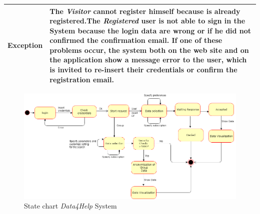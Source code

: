 \begin{table}[H]
\begin{tabular}{|p{3.5cm}|p{10.3cm}|}
    \hline
    \textbf{\large{Exception}} 			& The \emph{Visitor} cannot register himself because is already registered.\newline The \emph{Registered} user                                         is not able to sign in the System because the login data are wrong or if he did not confirmed  the confirmation email. \newline
    										If one of these problems occur, the system both on the web site and on the application show a message error to the user, which is invited to re-insert their credentials or confirm the registration email.\\
    
    \hline
    
    
    \end{tabular}
	
\end{table}

\begin{figure}[H]
    \centering
    \includegraphics[scale=0.4]{Pictures/state chart 1.png}
    \caption{State chart  \emph{Data4Help} System}
\end{figure}
